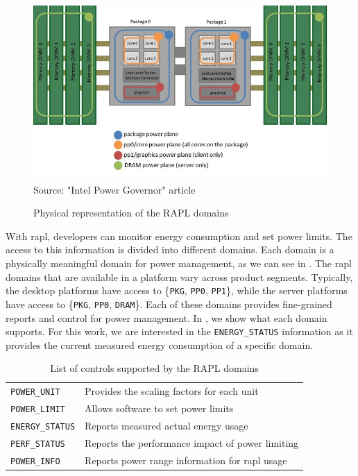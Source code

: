 \begin{savenotes}
\begin{figure}[htp]
  \centering
  \caption{Physical representation of the RAPL domains}
  \includegraphics[width=\columnwidth]{images/power-planes-placeholder}
  \footnotesize{Source: "Intel\textsuperscript{\textregistered} Power Governor" article~\cite{dimitrov:2012}}
  \label{fig:power-planes}
\end{figure}
\end{savenotes}

With \ac{rapl}, developers can monitor energy consumption and set power limits. The access to this information is divided into different domains. Each domain is a physically meaningful domain for power management, as we can see in . The \ac{rapl} domains that are available in a platform vary across product segments. Typically, the desktop platforms have access to \{\texttt{PKG}, \texttt{PP0}, \texttt{PP1}\}, while the server platforms have access to \{\texttt{PKG}, \texttt{PP0}, \texttt{DRAM}\}. Each of these domains provides fine-grained reports and control for power management. In , we show what each domain supports. For this work, we are interested in the \texttt{ENERGY\_STATUS} information as it provides the current measured energy consumption of a specific domain.

\begin{table}[htp]
	\centering
	\caption{List of controls supported by the RAPL domains}
	\begin{tabular}{ll}
	  \toprule
		\texttt{POWER\_UNIT}    & Provides the scaling factors for each unit\\
		\texttt{POWER\_LIMIT}   & Allows software to set power limits\\
		\texttt{ENERGY\_STATUS} & Reports measured actual energy usage\\
		\texttt{PERF\_STATUS}   & Reports the performance impact of power limiting\\
		\texttt{POWER\_INFO}    & Reports power range information for \ac{rapl} usage\\
	  \bottomrule
	\end{tabular}
	\label{tbl:rapl-domains}
\end{table}

